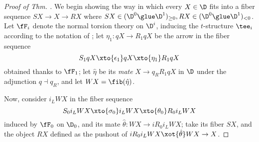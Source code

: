 \begin{proof}[Proof of Thm. \protect{\ref{gluing}}]
We begin showing the way in which every $X\in\D$ fits into a fiber sequence $SX\to X\to RX$ where $SX\in (\D^0\glue \D^1)_{\ge 0}, RX\in (\D^0\glue \D^1)_{<0}$. 
Let $\fF_i$ denote the normal torsion theory on $\D^i$, inducing the $t$-structure $\tee_i$ according to the notation of ; let $\eta_1 \colon qX\to R_1 qX$ be the arrow in the fiber sequence
\[\label{fibseqofq}
S_1 qX \xto{\epsilon_1} qX\xto{\eta_1} R_1 qX
\]
obtained thanks to $\fF_1$; let $\hat\eta$ be its \emph{mate} $X\to q_R R_1 qX$ in $\D$ under the adjunction $q\dashv q_R$, and let $WX=\fib(\hat \eta)$. 

Now, consider $i_L WX$ in the fiber sequence 
\[
S_0 i_L WX \xto{\sigma_0} i_L WX \xto{\theta_0} R_0 i_LWX\]
induced by $\fF_0$ on $\D_0$, and its mate $\hat \theta\colon WX\to i R_0 i_LWX$; take its fiber $SX$, and the object $RX$ defined as the pushout of $i R_0 i_L WX \xot{\hat\theta}
 WX \to X$.


\end{proof}
